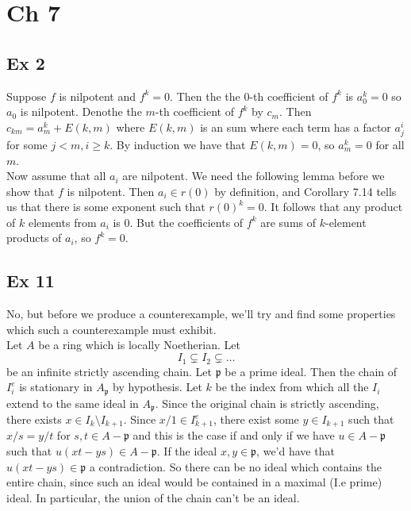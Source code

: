 \documentclass{article}
\theoremstyle{definition}
\begin{document}
\section*{Ch 7}


\subsection*{Ex 2}

Suppose $f$ is nilpotent and $f^k = 0$. Then the the $0$-th coefficient of
$f^k$ is $a_0^k = 0$ so $a_0$ is nilpotent. Denothe the $m$-th coefficient of
$f^{k}$ by $c_m$. Then $c_{km} = a_{m}^{k} + E(k, m)$ where $E(k, m)$ is an sum
where each term has a factor $a_{j}^{i}$ for some $j < m, i \geq k$. By
induction we have that $E(k, m) = 0$, so $a_{m}^{k} = 0$ for all $m$. \\

Now assume that all $a_i$ are nilpotent. We need the following lemma before we
show that $f$ is nilpotent. Then $a_i \in r(0)$ by definition, and Corollary
7.14 tells us that there is some exponent such that $r(0)^{k} = 0$. It follows
that any product of $k$ elements from $a_i$ is $0$. But the coefficients of $f^k$
are sums of $k$-element products of $a_i$, so $f^{k} = 0$.

\subsection*{Ex 11}

No, but before we produce a counterexample, we'll try and find some properties
which such a counterexample must exhibit. \\

Let $A$ be a ring which is locally Noetherian. Let 
\[
	I_1 \subsetneq I_2 \subsetneq \ldots
\] 
be an infinite strictly ascending chain. Let $\mathfrak{p}$ be a prime ideal.
Then the chain of $I_i^{e}$ is stationary in $A_{\mathfrak{p}}$ by hypothesis.
Let $k$ be the index from which all the $I_i$ extend to the same ideal in
$A_{\mathfrak{p}}$. Since the original chain is strictly ascending, there
exists $x \in I_k \setminus I_{k + 1}$. Since $x/1 \in I_{k + 1}^{e}$, there
exist some $y \in I_{k + 1}$ such that $x/s = y/t$ for $s, t \in A -
\mathfrak{p}$ and this is the case if and only if we have $u \in A -
\mathfrak{p}$ such that $u(xt - ys) \in A - \mathfrak{p}$. If the ideal $x, y
\in \mathfrak{p}$, we'd have that $u(xt - ys) \in \mathfrak{p}$ a
contradiction. So there can be no ideal which contains the entire chain, since
such an ideal would be contained in a maximal (I.e prime) ideal. In particular,
the union of the chain can't be an ideal. \\ 
\end{document}
